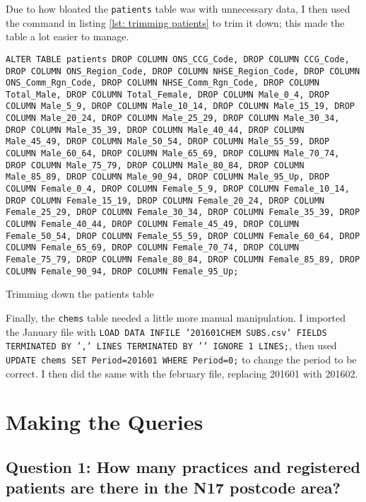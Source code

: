 \documentclass{report}
\begin{document}
Due to how bloated the \texttt{patients} table was with unnecessary data, I then used the command in listing \ref{lst: trimming patients} to trim it down; this made the table a lot easier to manage.

\begin{listing}[ht]
\begin{verbatim}
ALTER TABLE patients DROP COLUMN ONS_CCG_Code, DROP COLUMN CCG_Code, DROP COLUMN ONS_Region_Code, DROP COLUMN NHSE_Region_Code, DROP COLUMN ONS_Comm_Rgn_Code, DROP COLUMN NHSE_Comm_Rgn_Code, DROP COLUMN Total_Male, DROP COLUMN Total_Female, DROP COLUMN Male_0_4, DROP COLUMN Male_5_9, DROP COLUMN Male_10_14, DROP COLUMN Male_15_19, DROP COLUMN Male_20_24, DROP COLUMN Male_25_29, DROP COLUMN Male_30_34, DROP COLUMN Male_35_39, DROP COLUMN Male_40_44, DROP COLUMN Male_45_49, DROP COLUMN Male_50_54, DROP COLUMN Male_55_59, DROP COLUMN Male_60_64, DROP COLUMN Male_65_69, DROP COLUMN Male_70_74, DROP COLUMN Male_75_79, DROP COLUMN Male_80_84, DROP COLUMN Male_85_89, DROP COLUMN Male_90_94, DROP COLUMN Male_95_Up, DROP COLUMN Female_0_4, DROP COLUMN Female_5_9, DROP COLUMN Female_10_14, DROP COLUMN Female_15_19, DROP COLUMN Female_20_24, DROP COLUMN Female_25_29, DROP COLUMN Female_30_34, DROP COLUMN Female_35_39, DROP COLUMN Female_40_44, DROP COLUMN Female_45_49, DROP COLUMN Female_50_54, DROP COLUMN Female_55_59, DROP COLUMN Female_60_64, DROP COLUMN Female_65_69, DROP COLUMN Female_70_74, DROP COLUMN Female_75_79, DROP COLUMN Female_80_84, DROP COLUMN Female_85_89, DROP COLUMN Female_90_94, DROP COLUMN Female_95_Up;
\end{verbatim}
\caption{Trimming down the patients table}
\label{lst: trimming patients}
\end{listing}

Finally, the \texttt{chems} table needed a little more manual manipulation. I imported the January file with \texttt{LOAD DATA INFILE '201601CHEM SUBS.csv' FIELDS TERMINATED BY ',' LINES TERMINATED BY '\n' IGNORE 1 LINES;}, then used \texttt{UPDATE chems SET Period=201601 WHERE Period=0;} to change the period to be correct. I then did the same with the february file, replacing 201601 with 201602.

\chapter{Making the Queries}
\section{Question 1: How many practices and registered patients are there in the N17 postcode area?}
\end{document}
